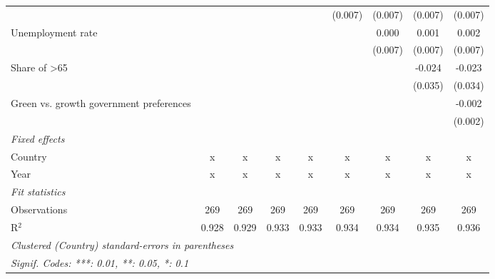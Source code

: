 \begin{table}[htbp]
\begin{tabular}{lcccccccc}
                                               &              &              &              &              & (0.007)     & (0.007)     & (0.007)     & (0.007)\\   
      Unemployment rate                        &              &              &              &              &             & 0.000       & 0.001       & 0.002\\   
                                               &              &              &              &              &             & (0.007)     & (0.007)     & (0.007)\\   
      Share of >65                             &              &              &              &              &             &             & -0.024      & -0.023\\   
                                               &              &              &              &              &             &             & (0.035)     & (0.034)\\   
      Green vs. growth government preferences  &              &              &              &              &             &             &             & -0.002\\   
                                               &              &              &              &              &             &             &             & (0.002)\\   
      \emph{Fixed effects}\\
      Country                                  & x            & x            & x            & x            & x           & x           & x           & x\\  
      Year                                     & x            & x            & x            & x            & x           & x           & x           & x\\  
      \midrule \emph{Fit statistics}\\
      Observations                             & 269          & 269          & 269          & 269          & 269         & 269         & 269         & 269\\  
      R$^2$                                    & 0.928        & 0.929        & 0.933        & 0.933        & 0.934       & 0.934       & 0.935       & 0.936\\  
      \midrule
      \multicolumn{9}{l}{\emph{Clustered (Country) standard-errors in parentheses}}\\
      \multicolumn{9}{l}{\emph{Signif. Codes: ***: 0.01, **: 0.05, *: 0.1}}\\
   \end{tabular}
\end{table}


